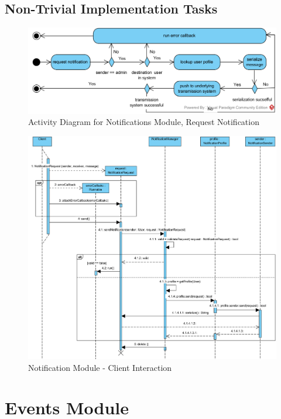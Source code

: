 \documentclass{article}
\begin{document}
\subsection{Non-Trivial Implementation Tasks}
\begin{figure}[H]
\includegraphics[width=\textwidth]{notification-activity-send}
\caption{Activity Diagram for Notifications Module, Request Notification}
\end{figure}
\begin{figure}[H]
\includegraphics[width=\textwidth]{notification-module-client-interaction}
\caption{Notification Module - Client Interaction}
\end{figure}



\section{Events Module}
\end{document}

